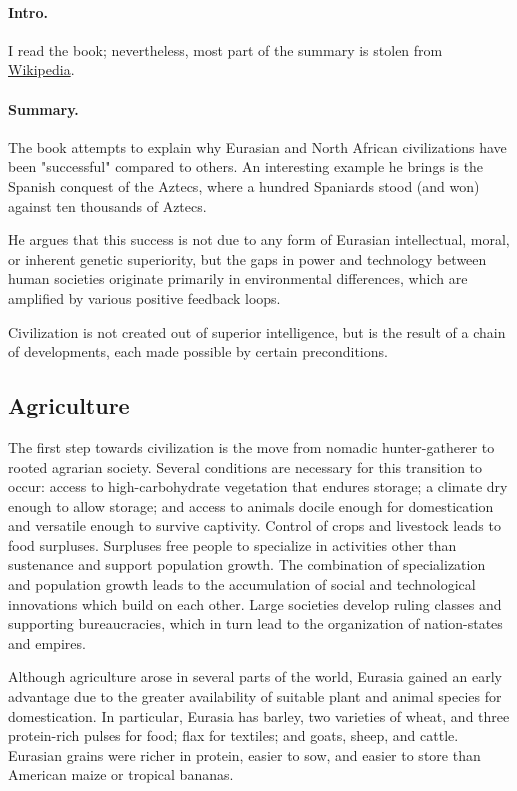 
\paragraph{Intro.} I read the book; nevertheless, most part of the summary is stolen from \href{https://en.wikipedia.org/wiki/Guns,_Germs,_and_Steel}{Wikipedia}.

\paragraph{Summary.} The book attempts to explain why Eurasian and North African civilizations have been "successful" compared to others. An interesting example he brings is the Spanish conquest of the Aztecs, where a hundred Spaniards stood (and won) against ten thousands of Aztecs.

He argues that this success is not due to any form of Eurasian intellectual, moral, or inherent genetic superiority, but the gaps in power and technology between human societies originate primarily in environmental differences, which are amplified by various positive feedback loops.

Civilization is not created out of superior intelligence, but is the result of a chain of developments, each made possible by certain preconditions.

\subsection{Agriculture}

The first step towards civilization is the move from nomadic hunter-gatherer to rooted agrarian society. Several conditions are necessary for this transition to occur: access to high-carbohydrate vegetation that endures storage; a climate dry enough to allow storage; and access to animals docile enough for domestication and versatile enough to survive captivity. Control of crops and livestock leads to food surpluses. Surpluses free people to specialize in activities other than sustenance and support population growth. The combination of specialization and population growth leads to the accumulation of social and technological innovations which build on each other. Large societies develop ruling classes and supporting bureaucracies, which in turn lead to the organization of nation-states and empires.

Although agriculture arose in several parts of the world, Eurasia gained an early advantage due to the greater availability of suitable plant and animal species for domestication. In particular, Eurasia has barley, two varieties of wheat, and three protein-rich pulses for food; flax for textiles; and goats, sheep, and cattle. Eurasian grains were richer in protein, easier to sow, and easier to store than American maize or tropical bananas.

